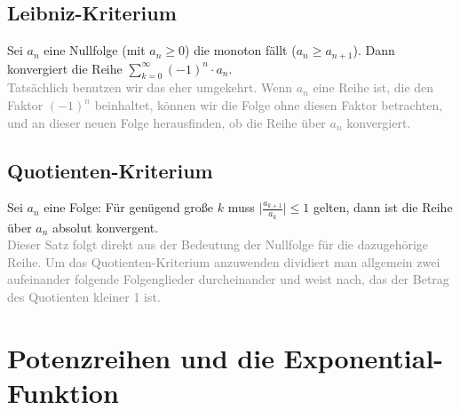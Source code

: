 \documentclass{report}
\begin{document}
		\subsection{Leibniz-Kriterium}
			Sei $a_n$ eine Nullfolge (mit $a_n \geq 0$) die monoton fällt ($a_n \geq a_{n+1}$). Dann konvergiert die Reihe $\sum_{k=0}^{\infty} (-1)^n \cdot a_n$.\\
			\textcolor{gray}{Tatsächlich benutzen wir das eher umgekehrt. Wenn $a_n$ eine Reihe ist, die den Faktor $(-1)^n$ beinhaltet, können wir die Folge ohne diesen Faktor betrachten, und an dieser neuen Folge herausfinden, ob die Reihe über $a_n$ konvergiert.}
		\subsection{Quotienten-Kriterium}
			Sei $a_n$ eine Folge: Für genügend große $k$ muss $\mid\frac{a_{k+1}}{a_k}\mid \leq 1$ gelten, dann ist die Reihe über $a_n$ absolut konvergent.\\
			\textcolor{gray}{Dieser Satz folgt direkt aus der Bedeutung der Nullfolge für die dazugehörige Reihe. Um das Quotienten-Kriterium anzuwenden dividiert man allgemein zwei aufeinander folgende Folgenglieder durcheinander und weist nach, das der Betrag des Quotienten kleiner 1 ist.}
	\section{Potenzreihen und die Exponential-Funktion}
		
	
\end{document}
